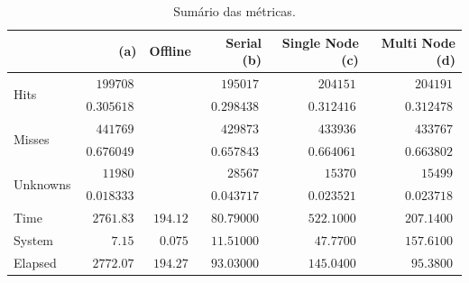 
\newcommand{\mr}[1]{\multirow{2}{*}{#1}}
\begin{table}[hbt]%
{\footnotesize
\setlength\tabcolsep{0.35em}
\caption{Sumário das métricas.}
\label{tab:exper-summary}
\begin{center}
\begin{tabular}{l|r|r|r|r|r}
                &  (a)  & Offline       & Serial (b)      & Single Node (c) & Multi Node (d)  \\\hline
\mr{Hits}       & $\ 199708\ $   &               & $\ 195017\ $    & $\ 204151\ $    & $\ 204191\ $    \\
                & $\ 0.305618\ $ &               & $\ 0.298438\ $  & $\ 0.312416\ $  & $\ 0.312478\ $  \\
\hline
\mr{Misses}     & $\ 441769\ $   &               & $\ 429873\ $    & $\ 433936\ $    & $\ 433767\ $    \\
                & $\ 0.676049\ $ &               & $\ 0.657843\ $  & $\ 0.664061\ $  & $\ 0.663802\ $  \\
\hline
\mr{Unknowns}   & $\ 11980\ $    &               & $\ 28567\ $     & $\ 15370\ $     & $\ 15499\ $     \\
                & $\ 0.018333\ $ &               & $\ 0.043717\ $  & $\ 0.023521\ $  & $\ 0.023718\ $  \\
\hline
Time            & $\ 2761.83\ $  & $\ 194.12\ $  & $\ 80.79000\ $  & $\ 522.1000\ $  & $\ 207.1400\ $  \\\hline
System          & $\ 7.15\ $     & $\  0.075\ $  & $\ 11.51000\ $  & $\  47.7700\ $  & $\ 157.6100\ $  \\\hline
Elapsed         & $\ 2772.07\ $  & $\ 194.27\ $  & $\ 93.03000\ $  & $\ 145.0400\ $  & $\  95.3800\ $  
\end{tabular}
\end{center}
}
\end{table}

